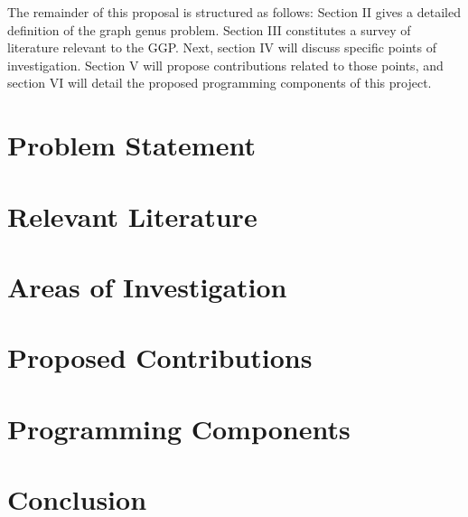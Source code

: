 \documentclass[12pt,conference]{IEEEtran}
\begin{document}
The remainder of this proposal is structured as follows: Section II gives a detailed definition of the graph genus problem. Section III constitutes a survey of literature relevant to the GGP. Next, section IV will discuss specific points of investigation. Section V will propose contributions related to those points, and section VI will detail the proposed programming components of this project.

\section{Problem Statement}

\section{Relevant Literature}

\section{Areas of Investigation}

\section{Proposed Contributions}

\section{Programming Components}

\section{Conclusion}

\begin{thebibliography}{1}
\bibitem{}
\end{thebibliography}
\end{document}
